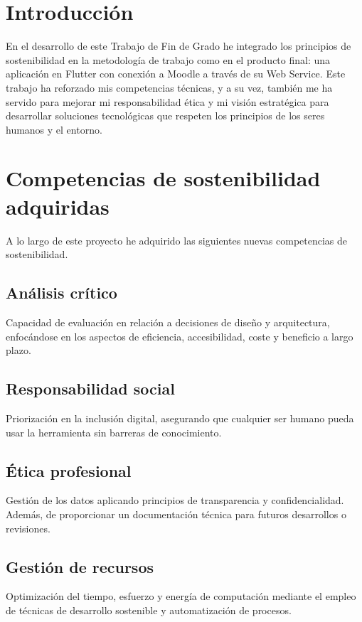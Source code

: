 
\section{Introducción}
En el desarrollo de este Trabajo de Fin de Grado he integrado los principios de sostenibilidad en la metodología de trabajo como en el producto final: una aplicación en Flutter con conexión a Moodle a través de su Web Service. Este trabajo ha reforzado mis competencias técnicas, y a su vez, también me ha servido para mejorar mi responsabilidad ética y mi visión estratégica para desarrollar soluciones tecnológicas que respeten los principios de los seres humanos y el entorno.

\section{Competencias de sostenibilidad adquiridas}
A lo largo de este proyecto he adquirido las siguientes nuevas competencias de sostenibilidad.

\subsection{Análisis crítico}
Capacidad de evaluación en relación a decisiones de diseño y arquitectura, enfocándose en los aspectos de eficiencia, accesibilidad, coste y beneficio a largo plazo.

\subsection{Responsabilidad social}
Priorización en la inclusión digital, asegurando que cualquier ser humano pueda usar la herramienta sin barreras de conocimiento.

\subsection{Ética profesional}
Gestión de los datos aplicando principios de transparencia y confidencialidad. Además, de proporcionar un documentación técnica para futuros desarrollos o revisiones.

\subsection{Gestión de recursos}
Optimización del tiempo, esfuerzo y energía de computación mediante el empleo de técnicas de desarrollo sostenible y automatización de procesos.

